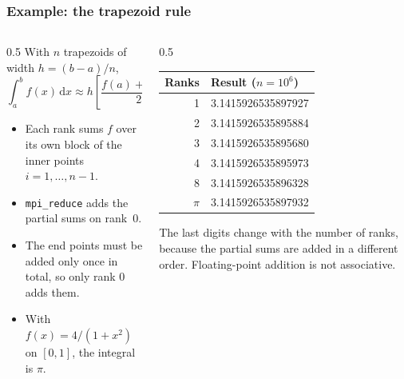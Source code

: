 \begin{frame}
  \frametitle{Example: the trapezoid rule}
  \begin{columns}[T]
    \begin{column}{0.5\textwidth}
      With $n$ trapezoids of width $h = (b - a) / n$,
      \[ \int_a^b f(x)\,\mathrm{d}x \approx h \left[ \frac{f(a) + f(b)}{2} + \sum_{i=1}^{n-1} f(a + ih) \right] \]
      \begin{itemize}
        \item Each rank sums $f$ over its own block of the inner points $i = 1, \ldots, n - 1$.
        \item \texttt{mpi\_reduce} adds the partial sums on rank~0.
        \item The end points must be added only once in total, so only rank 0 adds them.
        \item With $f(x) = 4 / (1 + x^2)$ on $[0, 1]$, the integral is $\pi$.
      \end{itemize}
    \end{column}

    \begin{column}{0.5\textwidth}
      \centering
      \footnotesize
      \begin{tabular}{rl}
        \textbf{Ranks} & \textbf{Result} ($n = 10^6$) \\
        \hline
        1 & 3.1415926535897927 \\
        2 & 3.1415926535895884 \\
        3 & 3.1415926535895680 \\
        4 & 3.1415926535895973 \\
        8 & 3.1415926535896328 \\
        \hline
        $\pi$ & 3.1415926535897932 \\
      \end{tabular}

      \vspace*{3mm}
      \raggedright
      \normalsize
      The last digits change with the number of ranks, because the partial sums are added in a different order. Floating-point addition is not associative.
    \end{column}
  \end{columns}
\end{frame}


